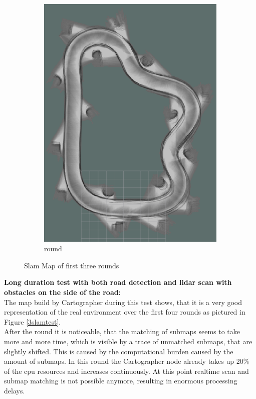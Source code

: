 \begin{figure}[H]
\begin{subfigure}{.3\linewidth}
		\includegraphics[width=\textwidth]{Pictures/2slamtest3}
		\caption{ round}
	\end{subfigure}

	\caption{Slam Map of first three rounds}
	\label{2slamtest}

\end{figure}



\textbf{Long duration test with both road detection and lidar scan with obstacles on the side of the road:}\\

The map build by Cartographer during this test shows, that it is a very good representation of the real environment over the first four rounds as pictured in Figure \ref{3slamtest}.\\

After the  round it is noticeable, that the matching of submaps seems to take more and more time, which is visible by a trace of unmatched submaps, that are slightly shifted. This is caused by the computational burden caused by the amount of submaps. In this round the Cartographer node already takes up 20\% of the cpu resources and increases continuously. At this point realtime scan and submap matching is not possible anymore, resulting in enormous processing delays.

